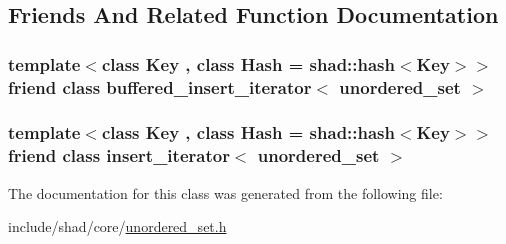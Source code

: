 \subsection{Friends And Related Function Documentation}
\hypertarget{classshad_1_1unordered__set_a37f994eeafee71345ca4e4e8cd1435e8}{
\subsubsection[{buffered\-\_\-insert\-\_\-iterator$<$ unordered\-\_\-set $>$}]{\setlength{\rightskip}{0pt plus 5cm}template$<$class Key , class Hash  = shad\-::hash$<$\-Key$>$$>$ friend class {\bf buffered\-\_\-insert\-\_\-iterator}$<$ {\bf unordered\-\_\-set} $>$\hspace{0.3cm}{\ttfamily [friend]}}}\label{classshad_1_1unordered__set_a37f994eeafee71345ca4e4e8cd1435e8}
\hypertarget{classshad_1_1unordered__set_a11eb7166ffbdc7c5b29b9b465faf2321}{
\subsubsection[{insert\-\_\-iterator$<$ unordered\-\_\-set $>$}]{\setlength{\rightskip}{0pt plus 5cm}template$<$class Key , class Hash  = shad\-::hash$<$\-Key$>$$>$ friend class {\bf insert\-\_\-iterator}$<$ {\bf unordered\-\_\-set} $>$\hspace{0.3cm}{\ttfamily [friend]}}}\label{classshad_1_1unordered__set_a11eb7166ffbdc7c5b29b9b465faf2321}


The documentation for this class was generated from the following file\-:\begin{DoxyCompactItemize}
\item 
include/shad/core/\hyperlink{unordered__set_8h}{unordered\-\_\-set.\-h}\end{DoxyCompactItemize}
